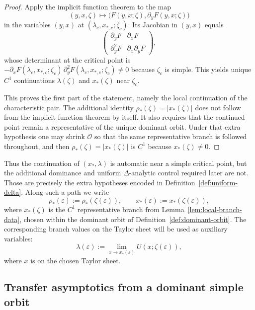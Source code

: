 \documentclass[11pt]{amsart}
\numberwithin{equation}{section}
\theoremstyle{plain}
\theoremstyle{definition}
\theoremstyle{remark}
\begin{document}
\begin{proof}
	Apply the implicit function theorem to the map
	\[
		(y,x,\zeta)\mapsto \bigl(F(y,x;\zeta),\partial_yF(y,x;\zeta)\bigr)
	\]
	in the variables $(y,x)$ at $(\lambda_c,x_{*,c};\zeta_c)$. Its Jacobian in
	$(y,x)$ equals
	\[
		\begin{pmatrix}
			\partial_yF & \partial_xF \\
			\partial_y^2F & \partial_x\partial_yF
		\end{pmatrix},
	\]
	whose determinant at the critical point is
	$-\partial_xF(\lambda_c,x_{*,c};\zeta_c)\,\partial_y^2F(\lambda_c,x_{*,c};\zeta_c)\neq0$
	because $\zeta_c$ is simple. This yields unique $C^1$ continuations
	$\lambda(\zeta)$ and $x_*(\zeta)$ near $\zeta_c$.

	This proves the first part of the statement, namely the local continuation of
	the characteristic pair. The additional identity
	$\rho_*(\zeta)=|x_*(\zeta)|$ does not follow from the implicit function theorem by itself. It also requires that the continued point remain a representative of the unique dominant orbit. Under that extra hypothesis one may shrink
	$\mathcal O$ so that the same representative branch is followed throughout,
	and then $\rho_*(\zeta)=|x_*(\zeta)|$ is $C^1$ because $x_*(\zeta)\neq0$.
\end{proof}

Thus the continuation of \((x_*,\lambda)\) is automatic near a simple critical
point, but the additional dominance and uniform \(\Delta\)-analytic control
required later are not. Those are precisely the extra hypotheses encoded in
Definition~\ref{def:uniform-delta}.
Along such a path we write
\[
	\rho_*(\varepsilon):=\rho_*(\zeta(\varepsilon)),\qquad x_*(\varepsilon):=x_*(\zeta(\varepsilon)),
\]
where $x_*(\zeta)$ is the $C^1$ representative branch from
Lemma~\ref{lem:local-branch-data}, chosen within the dominant orbit of
Definition~\ref{def:dominant-orbit}.
The corresponding branch values on the Taylor sheet will be used as auxiliary variables:
\begin{equation}\label{eq:lambda-def}
	\lambda(\varepsilon)
	:=
	\lim_{x\to x_*(\varepsilon)}
	U(x;\zeta(\varepsilon)),
\end{equation}
where $x$ is on the chosen Taylor sheet.

\subsection{Transfer asymptotics from a dominant simple orbit}
\end{document}
